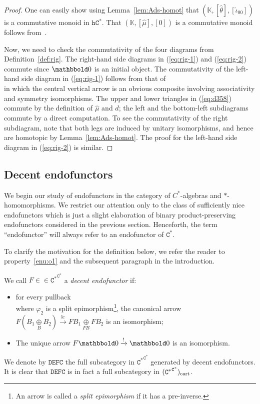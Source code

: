 \documentclass[10pt]{simplearticle}
\newcommand{\tikzinput}[1]{}
\newcommand{\DEFC}{\mathbb{\mathtt{DEFC}}}
\newcommand{\Cstar}{\mathtt{C^{*}}}
\newcommand{\hCstar}{\mathtt{hC^{*}}}
\newcommand{\EFC}{\Cstar^{\Cstar}}
\newcommand{\bbzero}{\mathbbold0}
\newcommand{\bpp}[1]{(#1^{#1})_{\textup{cart}}}
\newcommand{\terminal}{\operatorname{!}}
\newcommand{\lc}{\operatorname{lc}}
\newcommand{\oK}{\mathbb{K}}
\begin{document}
\begin{proof}
One can easily show using Lemma~\ref{lem:Ads-homot} that $(\oK,[\widehat{\theta}],[\widehat{\iota}_{00}])$
is a commutative monoid in $\hCstar$. That $(\oK,[\widehat{\mu}],[0])$
is a commutative monoid follows from~\cite[Lemma~1.3.12]{Jensen-Thomsen}.

Now, we need to check the commutativity of the four diagrams from
Definition~\ref{def:rig}. The right-hand side diagrams in (\ref{eq:rig-1})
and (\ref{eq:rig-2}) commute since $\bbzero$ is an initial object.
The commutativity of the left-hand side diagram in (\ref{eq:rig-1})
follows from that of
\begin{equation}
\tikzinput{d358}\label{eq:d358}
\end{equation}
in which the central vertical arrow is an obvious composite involving
associativity and symmetry isomorphisms. The upper and lower triangles
in (\ref{eq:d358}) commute by the definition of $\widehat{\mu}$
and $\widehat{d}$; the left and the bottom-left subdiagrams commute
by a direct computation. To see the commutativity of the right subdiagram,
note that both legs are induced by unitary isomorphisms, and hence
are homotopic by Lemma~\ref{lem:Ads-homot}. The proof for the left-hand
side diagram in (\ref{eq:rig-2}) is similar.
\end{proof}

\subsection{\label{subsec:decent-end}Decent endofunctors}

We begin our study of endofunctors in the category of $C^{*}$-algebras
and $*$-homomorphisms. We restrict our attention only to the class
of sufficiently nice endofunctors which is just a slight elaboration
of binary product-preserving endofunctors considered in the previous
section. Henceforth, the term ``endofunctor'' will always refer
to an endofunctor of $\Cstar$.

To
clarify the motivation for the definition below,
we refer the reader to property~\ref{enu:o1} and the subsequent
paragraph in the introduction.

\begin{defn}\label{def:decentFunctor}
 We call $F\in\in\Cstar^{\Cstar}$ a \emph{decent
endofunctor} if:
\begin{itemize}
\item for every pullback
\[
\tikzinput{d249}
\]
where $\varphi_{2}$ is a split epimorphism\footnote{An arrow is called a \emph{split epimorphism} if it has a pre-inverse.},
the canonical arrow $F(B_{1}\underset{B}{\oplus}B_{2})\xrightarrow{\lc}FB_{1}\underset{FB}{\oplus}FB_{2}$
is an isomorphism;
\item The unique arrow $F\bbzero\xrightarrow{\terminal}\bbzero$ is an isomorphism.
\end{itemize}
We denote by $\DEFC$ the full subcategory in $\EFC$ generated by
decent endofunctors. It is clear that $\DEFC$ is in fact a full subcategory
in $\bpp{\Cstar}$.
\end{defn}
\end{document}
